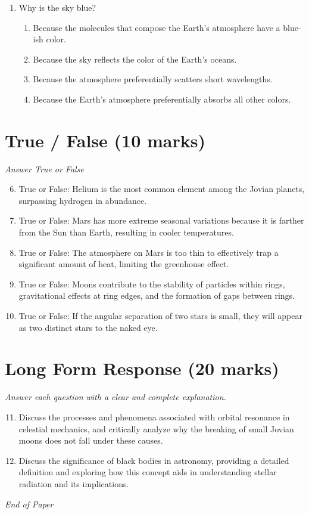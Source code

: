 \documentclass[12pt]{article}
\begin{document}
\begin{enumerate}[label=\arabic*.]
\begin{enumerate}[label=(\alph*)]
    \item 12
\end{enumerate}
\item Why is the sky blue?
\begin{enumerate}[label=(\alph*)]
    \item Because the molecules that compose the Earth's atmosphere have a blue-ish color.
    \item Because the sky reflects the color of the Earth's oceans.
    \item Because the atmosphere preferentially scatters short wavelengths.
    \item Because the Earth's atmosphere preferentially absorbs all other colors.
\end{enumerate}
\end{enumerate}

\section*{True / False (10 marks)}
\textit{Answer True or False}
\begin{enumerate}[label=\arabic*.]
\setcounter{enumi}{5}
\item True or False: Helium is the most common element among the Jovian planets, surpassing hydrogen in abundance.
\item True or False: Mars has more extreme seasonal variations because it is farther from the Sun than Earth, resulting in cooler temperatures.
\item True or False: The atmosphere on Mars is too thin to effectively trap a significant amount of heat, limiting the greenhouse effect.
\item True or False: Moons contribute to the stability of particles within rings, gravitational effects at ring edges, and the formation of gaps between rings.
\item True or False: If the angular separation of two stars is small, they will appear as two distinct stars to the naked eye.
\end{enumerate}

\section*{Long Form Response (20 marks)}
\textit{Answer each question with a clear and complete explanation.}
\begin{enumerate}[label=\arabic*.]
\setcounter{enumi}{10}
\item Discuss the processes and phenomena associated with orbital resonance in celestial mechanics, and critically analyze why the breaking of small Jovian moons does not fall under these causes.
\item Discuss the significance of black bodies in astronomy, providing a detailed definition and exploring how this concept aids in understanding stellar radiation and its implications.
\end{enumerate}

\vfill
\noindent\textit{End of Paper}
\end{document}
